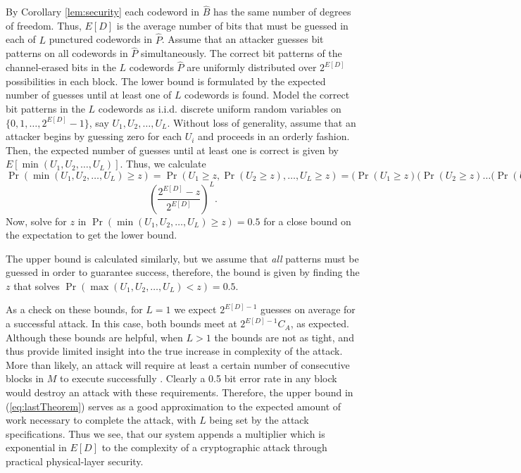 \documentclass[10pt,twocolumn,twoside]{IEEEtran} \newlength{\pic}
\theoremstyle{definition}
\theoremstyle{remark}
\theoremstyle{plain}
\begin{document}
\begin{IEEEproof}
 By Corollary \ref{lem:security} each codeword in $\hat{B}$ has the same number of degrees of freedom. Thus, $E[D]$ is the average number of bits that must be guessed in each of $L$ punctured codewords in $\hat{P}$. Assume that an attacker guesses bit patterns on all codewords in $\hat{P}$ simultaneously. The correct bit patterns of the channel-erased bits in the $L$ codewords $\hat{P}$ are uniformly distributed over $2^{E[D]}$ possibilities in each block. The lower bound is formulated by the expected number of guesses until at least one of $L$ codewords is found. Model the correct bit patterns in the $L$ codewords as i.i.d. discrete uniform random variables on $\{0,1,\ldots,2^{E[D]}-1\}$, say $U_1, U_2, \ldots, U_L$. Without loss of generality, assume that an attacker begins by guessing zero for each $U_i$ and proceeds in an orderly fashion. Then, the expected number of guesses until at least one is correct is given by $E[\min(U_1,U_2,\ldots,U_L)]$. Thus, we calculate $\Pr(\min(U_1,U_2,\ldots,U_L)\geq z)= \Pr(U_1\geq z,\Pr(U_2\geq z),\ldots,U_L\geq z) = (\Pr(U_1\geq z)(\Pr(U_2\geq z)\ldots(\Pr(U_L\geq z) = $
 \begin{equation}
  \left(\frac{2^{E[D]}-z}{2^{E[D]}}\right)^L.
 \end{equation}
 Now, solve for $z$ in $\Pr(\min(U_1,U_2,\ldots,U_L)\geq z)=0.5$ for a close bound on the expectation to get the lower bound.

 The upper bound is calculated similarly, but we assume that \emph{all} patterns must be guessed in order to guarantee success, therefore, the bound is given by finding the $z$ that solves $\Pr(\max(U_1,U_2,\ldots,U_L)<z)=0.5$.
\end{IEEEproof}
As a check on these bounds, for $L=1$ we expect $2^{E[D]-1}$ guesses on average for a successful attack. In this case, both bounds meet at $2^{E[D]-1}C_A$, as expected. Although these bounds are helpful, when $L>1$ the bounds are not as tight, and thus provide limited insight into the true increase in complexity of the attack. More than likely, an attack will require at least a certain number of consecutive blocks in $M$ to execute successfully \cite{Meier89}. Clearly a 0.5 bit error rate in any block would destroy an attack with these requirements. Therefore, the upper bound in (\ref{eq:lastTheorem}) serves as a good approximation to the expected amount of work necessary to complete the attack, with $L$ being set by the attack specifications. Thus we see, that our system appends a multiplier which is exponential in $E[D]$ to the complexity of a cryptographic attack through practical physical-layer security.
\end{document}
